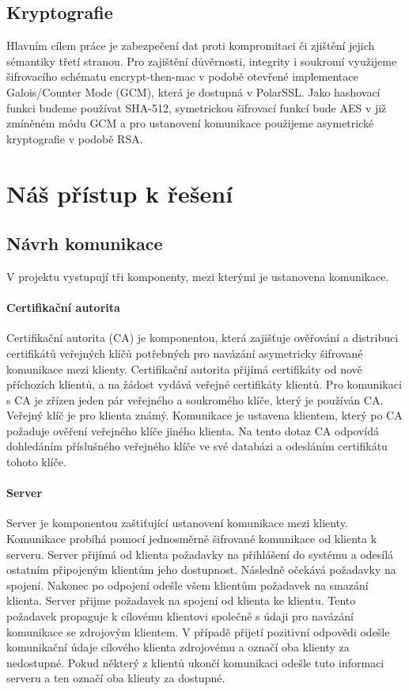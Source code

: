 \documentclass[a4paper, 12pt, titlepage]{article}
\begin{document}
\subsection{Kryptografie}
Hlavním cílem práce je zabezpečení dat proti kompromitaci či zjištění jejich sémantiky
třetí stranou.
Pro zajištění důvěrnosti, integrity i soukromí využijeme šifrovacího schématu 
encrypt-then-mac v podobě otevřené implementace Galois/Counter Mode (GCM),
která je dostupná v PolarSSL. Jako hashovací funkci budeme používat SHA-512, 
symetrickou šifrovací funkcí bude AES v již zmíněném módu GCM a pro ustanovení 
komunikace použijeme asymetrické kryptografie v podobě RSA.

\section{Náš přístup k řešení}

\subsection{Návrh komunikace}
V projektu vystupují tři komponenty, mezi kterými je ustanovena komunikace.

\paragraph{Certifikační autorita}
Certifikační autorita (CA) je komponentou, která zajišťuje ověřování a 
distribuci certifikátů veřejných klíčů
potřebných pro navázání asymetricky šifrované komunikace mezi klienty. 
Certifikační autorita přijímá certifikáty od nově příchozích klientů, a na 
žádost vydává veřejné certifikáty klientů. Pro komunikaci s CA je zřízen jeden 
pár veřejného a  soukromého klíče, který je používán CA. Veřejný klíč je pro 
klienta známý. Komunikace je ustavena klientem, který po CA požaduje ověření 
veřejného klíče jiného klienta. Na tento dotaz CA odpovídá dohledáním 
příslušného veřejného klíče ve své databázi a odesláním certifikátu tohoto 
klíče.

\paragraph{Server}
Server je komponentou zaštiťující ustanovení komunikace mezi klienty. Komunikace 
probíhá pomocí jednosměrně šifrované komunikace od klienta k serveru. Server 
přijímá od klienta požadavky na přihlášení do systému a odesílá ostatním 
připojeným klientům jeho dostupnost. Následně očekává požadavky na spojení. 
Nakonec po odpojení odešle všem klientům požadavek na smazání klienta.
Server přijme požadavek na spojení od klienta ke klientu. Tento požadavek 
propaguje
k cílovému klientovi společně s údaji pro navázání komunikace se zdrojovým 
klientem. V případě přijetí pozitivní odpovědi odešle komunikační údaje cílového 
klienta zdrojovému a označí oba klienty za nedostupné. Pokud některý z klientů 
ukončí komunikaci odešle tuto informaci serveru a ten označí oba klienty za 
dostupné.
\end{document}
